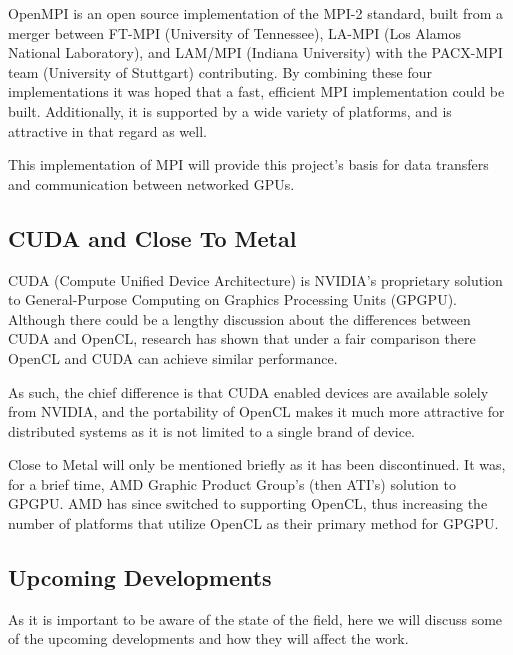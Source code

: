 \documentclass[../thesis.tex]{subfiles}
\begin{document}

        OpenMPI is an open source implementation of the MPI-2 standard, built from a merger between FT-MPI (University of Tennessee), LA-MPI (Los Alamos National Laboratory), and LAM/MPI (Indiana University) with the PACX-MPI team (University of Stuttgart) contributing. By combining these four implementations it was hoped that a fast, efficient MPI implementation could be built.\cite{openmpiwebsite} Additionally, it is supported by a wide variety of platforms, and is attractive in that regard as well.

        This implementation of MPI will provide this project's basis for data transfers and communication between networked GPUs.
    
    \subsection{CUDA and Close To Metal} %
    \label{sub:cuda_and_close_to_metal}
        CUDA (Compute Unified Device Architecture) is NVIDIA's proprietary solution to General-Purpose Computing on Graphics Processing Units (GPGPU). Although there could be a lengthy discussion about the differences between CUDA and OpenCL, research has shown that under a fair comparison there OpenCL and CUDA can achieve similar performance\cite{6047190}.

        As such, the chief difference is that CUDA enabled devices are available solely from NVIDIA\cite{cudagpus}, and the portability of OpenCL makes it much more attractive for distributed systems as it is not limited to a single brand of device.

        Close to Metal will only be mentioned briefly as it has been discontinued. It was, for a brief time, AMD Graphic Product Group's (then ATI's) solution to GPGPU. AMD has since switched to supporting OpenCL, thus increasing the number of platforms that utilize OpenCL as their primary method for GPGPU.


    \subsection{Upcoming Developments} %
    \label{sub:upcoming_developments}
    As it is important to be aware of the state of the field, here we will discuss some of the upcoming developments and how they will affect the work.
\end{document}
